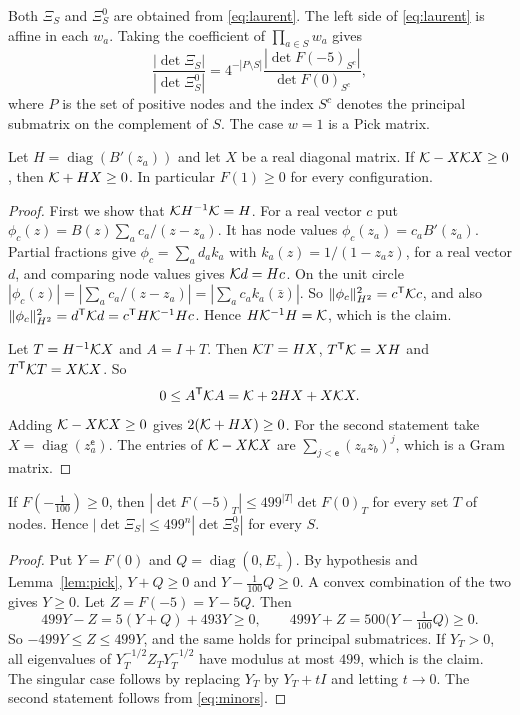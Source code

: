 Both $\Xi_S$ and $\Xi^0_S$ are obtained from \eqref{eq:laurent}. The left side of \eqref{eq:laurent} is
affine in each $w_a$. Taking the coefficient of $\prod_{a\in S}w_a$ gives
\begin{equation}\label{eq:minors}
 \frac{|\det\Xi_S|}{|\det\Xi^0_S|}=4^{-|P\setminus S|}\frac{|\det F(-5)_{S^c}|}{\det F(0)_{S^c}},
\end{equation}
where $P$ is the set of positive nodes and the index $S^c$ denotes the principal submatrix on the complement of
$S$. The case $w=1$ is a Pick matrix.

\begin{lemma}\label{lem:pick}
Let $H=\operatorname{diag}(B'(z_a))$ and let $X$ be a real diagonal matrix. If $\mathcal K-X\mathcal K X\ge0$, then $\mathcal K+HX\ge0$. In
particular $F(1)\ge0$ for every configuration.
\end{lemma}

\begin{proof}
First we show that $\mathcal K H^{-1}\mathcal K=H$. For a real vector $c$ put $\phi_c(z)=B(z)\sum_ac_a/(z-z_a)$. It has node values
$\phi_c(z_a)=c_aB'(z_a)$. Partial fractions give $\phi_c=\sum_ad_ak_a$ with $k_a(z)=1/(1-z_az)$, for a real vector $d$, and comparing node values
gives $\mathcal K d=Hc$. On the unit circle $|\phi_c(z)|=|\sum_ac_a/(z-z_a)|=|\sum_ac_ak_a(\bar z)|$. So $\|\phi_c\|_{H^2}^2=c^{\mathsf T}\mathcal K c$, and also
$\|\phi_c\|_{H^2}^2=d^{\mathsf T}\mathcal K d=c^{\mathsf T}H\mathcal K^{-1}Hc$. Hence $H\mathcal K^{-1}H=\mathcal K$, which is the claim.

Let $T=H^{-1}\mathcal K X$ and $A=I+T$. Then $\mathcal K T=HX$, $T^{\mathsf T}\mathcal K=XH$ and $T^{\mathsf T}\mathcal K T=X\mathcal K X$. So
\[
 0\le A^{\mathsf T}\mathcal K A=\mathcal K+2HX+X\mathcal K X .
\]
Adding $\mathcal K-X\mathcal K X\ge0$ gives $2(\mathcal K+HX)\ge0$. For the second statement take $X=\operatorname{diag}(z_a^{\mathsf e})$. The entries of
$\mathcal K-X\mathcal K X$ are $\sum_{j<\mathsf e}(z_az_b)^j$, which is a Gram matrix.
\end{proof}

\begin{lemma}\label{lem:compare}
If $F(-\frac1{100})\ge0$, then $|\det F(-5)_T|\le499^{|T|}\det F(0)_T$ for every set $T$ of nodes. Hence
$|\det\Xi_S|\le499^n|\det\Xi^0_S|$ for every $S$.
\end{lemma}

\begin{proof}
Put $Y=F(0)$ and $Q=\operatorname{diag}(0,E_+)$. By hypothesis and Lemma~\ref{lem:pick}, $Y+Q\ge0$ and
$Y-\frac1{100}Q\ge0$. A convex combination of the two gives $Y\ge0$. Let $Z=F(-5)=Y-5Q$. Then
\[
 499Y-Z=5(Y+Q)+493Y\ge0,\qquad 499Y+Z=500\bigl(Y-\tfrac1{100}Q\bigr)\ge0 .
\]
So $-499Y\le Z\le499Y$, and the same holds for principal submatrices. If $Y_T>0$, all eigenvalues of
$Y_T^{-1/2}Z_TY_T^{-1/2}$ have modulus at most $499$, which is the claim. The singular case follows by replacing
$Y_T$ by $Y_T+tI$ and letting $t\to0$. The second statement follows from \eqref{eq:minors}.
\end{proof}

